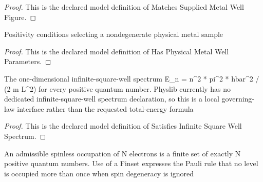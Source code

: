 \begin{proof}
  This is the declared model definition of Matches Supplied Metal Well Figure.
\end{proof}
\begin{definition}
  \label{def:physics:phyx-mini-0603:phyxminiproblems-problemphyxmini0603-hasphysicalmetalwellparameters}
  Positivity conditions selecting a nondegenerate physical metal sample
\end{definition}
\begin{proof}
  This is the declared model definition of Has Physical Metal Well Parameters.
\end{proof}
\begin{definition}
  \label{def:physics:phyx-mini-0603:phyxminiproblems-problemphyxmini0603-satisfiesinfinitesquarewellspectrum}
  The one-dimensional infinite-square-well spectrum E\_n = n\textasciicircum{}2 * pi\textasciicircum{}2 * hbar\textasciicircum{}2 / (2 m L\textasciicircum{}2) for every positive quantum number. Physlib currently has no dedicated infinite-square-well spectrum declaration, so this is a local governing-law interface rather than the requested total-energy formula
\end{definition}
\begin{proof}
  This is the declared model definition of Satisfies Infinite Square Well Spectrum.
\end{proof}
\begin{definition}
  \label{def:physics:phyx-mini-0603:phyxminiproblems-problemphyxmini0603-isadmissiblespinlessoccupation}
  An admissible spinless occupation of N electrons is a finite set of exactly N positive quantum numbers. Use of a Finset expresses the Pauli rule that no level is occupied more than once when spin degeneracy is ignored
\end{definition}

